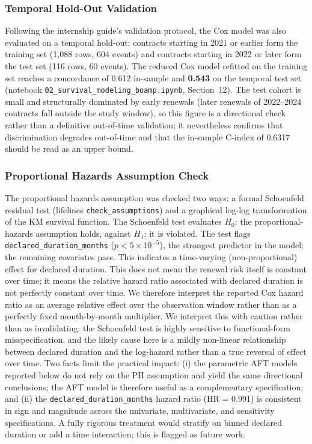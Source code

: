 \documentclass[12pt, a4paper]{article}
\begin{document}
\subsubsection*{Temporal Hold-Out Validation}

Following the internship guide's validation protocol, the Cox model was also
evaluated on a temporal hold-out: contracts starting in 2021 or earlier form the
training set (1{,}088 rows, 604 events) and contracts starting in 2022 or later
form the test set (116 rows, 60 events). The reduced Cox model refitted on the
training set reaches a concordance of 0.612 in-sample and \textbf{0.543} on the
temporal test set (notebook \texttt{02\_survival\_modeling\_boamp.ipynb},
Section~12). The test cohort is small and structurally dominated by early
renewals (later renewals of 2022--2024 contracts fall outside the study window),
so this figure is a directional check rather than a definitive out-of-time
validation; it nevertheless confirms that discrimination degrades out-of-time
and that the in-sample C-index of 0.6317 should be read as an upper bound.

\subsubsection*{Proportional Hazards Assumption Check}

The proportional hazards assumption was checked two ways: a formal Schoenfeld
residual test (lifelines \texttt{check\_assumptions}) and a graphical log-log
transformation of the KM survival function. The Schoenfeld test evaluates
$H_0$: the proportional-hazards assumption holds, against $H_1$: it is
violated. The test flags \texttt{declared\_duration\_months} ($p < 5\times10^{-5}$), the
strongest predictor in the model; the remaining covariates pass. This indicates
a time-varying (non-proportional) effect for declared duration. This does not
mean the renewal risk itself is constant over time; it means the relative
hazard ratio associated with declared duration is not perfectly constant over
time. We therefore interpret the reported Cox hazard ratio as an average
relative effect over the observation window rather than as a perfectly fixed
month-by-month multiplier. We interpret
this with caution rather than as invalidating: the Schoenfeld test is highly
sensitive to functional-form misspecification, and the likely cause here is a
mildly non-linear relationship between declared duration and the log-hazard
rather than a true reversal of effect over time. Two facts limit the practical
impact: (i) the parametric AFT models reported below do not rely on the PH
assumption and yield the same directional conclusions; the AFT model is
therefore useful as a complementary specification; and (ii) the
\texttt{declared\_duration\_months} hazard ratio (HR = 0.991) is consistent in
sign and magnitude across the univariate, multivariate, and sensitivity
specifications. A fully rigorous treatment would stratify on binned declared
duration or add a time interaction; this is flagged as future work.
\end{document}
